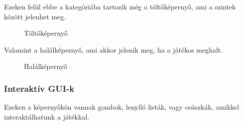 Ezeken felül ebbe a kategóriába tartozik még a töltőképernyő, ami a szintek között jelenhet meg.
\begin{figure}[H]
	\noindent{}
	\caption{Töltőképernyő}
	\label{loading}
\end{figure}

\cleardoublepage
Valamint a halálképernyő, ami akkor jelenik meg, ha a játékos meghalt.
\begin{figure}[H]
	\noindent{}
	\caption{Halálképernyő}
	\label{dead}
\end{figure}

\subsubsection{Interaktív GUI-k}
Ezeken a képernyőkön vannak gombok, lenyíló listák, vagy csúszkák, amikkel interaktálhatunk a játékkal.

